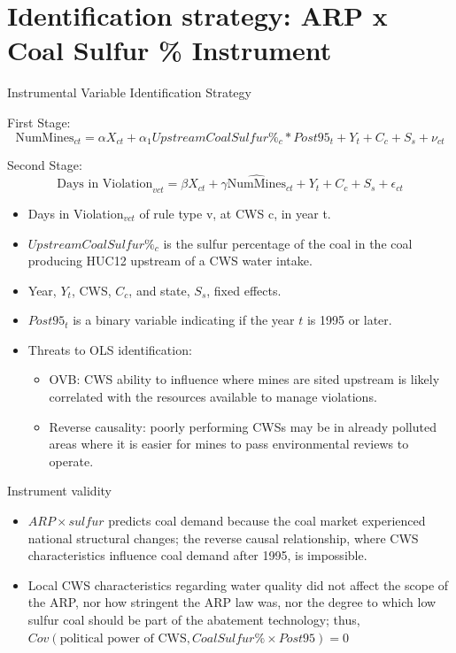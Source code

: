 \documentclass{beamer}
\begin{document}
\section{Identification strategy: ARP x Coal Sulfur \% Instrument}

\begin{frame}{Instrumental Variable Identification Strategy}

First Stage:
\begin{equation}
\text{NumMines}_{ct}=\alpha X_{ct}+ \alpha_1UpstreamCoalSulfur\%_c*Post95_t+ Y_t+C_c+S_s+\nu_{ct}    
\end{equation}

Second Stage:
\begin{equation}
\text{Days in Violation}_{vct}=\beta X_{ct}+\gamma\widehat{\text{NumMines}}_{ct}+Y_t+C_c+S_s+\epsilon_{ct}
\end{equation}

\begin{itemize}
    \item Days in Violation$_{vct}$ of rule type v, at CWS c, in year t.
    \item $UpstreamCoalSulfur\%_c$ is the sulfur percentage of the coal in the coal producing HUC12 upstream of a CWS water intake.
    \item Year, $Y_t$, CWS, $C_c$, and state, $S_s$, fixed effects. 
    \item $Post95_t$ is a binary variable indicating if the year $t$ is 1995 or later.
    \item Threats to OLS identification:
    \begin{itemize}
        \item OVB: CWS ability to influence where mines are sited upstream is likely correlated with the resources available to manage violations.
        \item Reverse causality: poorly performing CWSs may be in already polluted areas where it is easier for mines to pass environmental reviews to operate.
        \end{itemize}
\end{itemize}
\end{frame}

\begin{frame}{Instrument validity}
    \begin{itemize}
        \item  $ARP \times sulfur$ predicts coal demand because the coal market experienced national structural changes; the reverse causal relationship, where CWS characteristics influence coal demand after 1995, is impossible.
        \item Local CWS characteristics regarding water quality did not affect the scope of the ARP, nor how stringent the ARP law was, nor the degree to which low sulfur coal should be part of the abatement technology; thus, $Cov(\text{political power of CWS}, Coal Sulfur \% \times Post95)=0$
    \end{itemize}
\end{frame}
\end{document}
